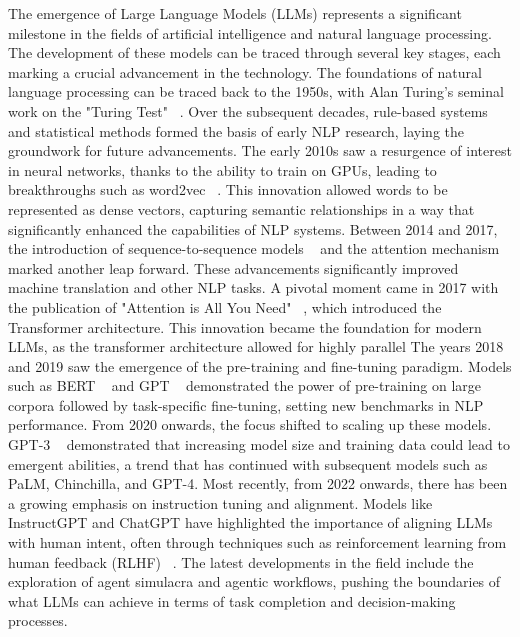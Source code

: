 \documentclass[a4paper, oneside]{discothesis}
\begin{document}
The emergence of Large Language Models (LLMs) represents a significant milestone in the fields of artificial intelligence and natural language processing. The development of these models can be traced through several key stages, each marking a crucial advancement in the technology.
The foundations of natural language processing can be traced back to the 1950s, with Alan Turing's seminal work on the "Turing Test" ~\cite{turing1950computing}. Over the subsequent decades, rule-based systems and statistical methods formed the basis of early NLP research, laying the groundwork for future advancements.
The early 2010s saw a resurgence of interest in neural networks, thanks to the ability to train on GPUs, leading to breakthroughs such as word2vec ~\cite{mikolov2013efficient}. This innovation allowed words to be represented as dense vectors, capturing semantic relationships in a way that significantly enhanced the capabilities of NLP systems.
Between 2014 and 2017, the introduction of sequence-to-sequence models ~\cite{sutskever2014sequence} and the attention mechanism ~\cite{bahdanau2014neural} marked another leap forward. These advancements significantly improved machine translation and other NLP tasks.
A pivotal moment came in 2017 with the publication of "Attention is All You Need" ~\cite{vaswani2017attention}, which introduced the Transformer architecture. This innovation became the foundation for modern LLMs, as the transformer architecture allowed for highly parallel 
The years 2018 and 2019 saw the emergence of the pre-training and fine-tuning paradigm. Models such as BERT ~\cite{devlin2018bert} and GPT ~\cite{radford2018improving} demonstrated the power of pre-training on large corpora followed by task-specific fine-tuning, setting new benchmarks in NLP performance.
From 2020 onwards, the focus shifted to scaling up these models. GPT-3 ~\cite{brown2020language} demonstrated that increasing model size and training data could lead to emergent abilities, a trend that has continued with subsequent models such as PaLM, Chinchilla, and GPT-4.
Most recently, from 2022 onwards, there has been a growing emphasis on instruction tuning and alignment. Models like InstructGPT and ChatGPT have highlighted the importance of aligning LLMs with human intent, often through techniques such as reinforcement learning from human feedback (RLHF) ~\cite{ouyang2022training}.
The latest developments in the field include the exploration of agent simulacra and agentic workflows, pushing the boundaries of what LLMs can achieve in terms of task completion and decision-making processes.
\end{document}
